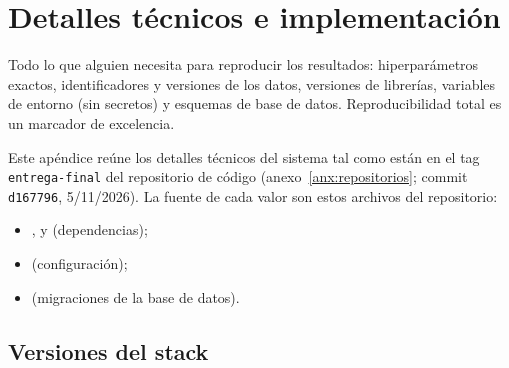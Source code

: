 
\chapter{Detalles técnicos e implementación}\label{apx:tecnicos}

\begin{guia}
Todo lo que alguien necesita para reproducir los resultados:
hiperparámetros exactos, identificadores y versiones de los datos,
versiones de librerías, variables de entorno (sin secretos) y esquemas
de base de datos. Reproducibilidad total es un marcador de excelencia.
\end{guia}

Este apéndice reúne los detalles técnicos del sistema tal como están en
el tag \texttt{entrega-final} del repositorio de código
(anexo~\ref{anx:repositorios}; commit \texttt{d167796}, 5/11/2026). La fuente de cada valor son estos archivos del repositorio:

\begin{itemize}
    \item {},  y
           (dependencias);
    \item {}
          (configuración);
    \item {} (migraciones de
          la base de datos).
\end{itemize}

\section{Versiones del stack}


